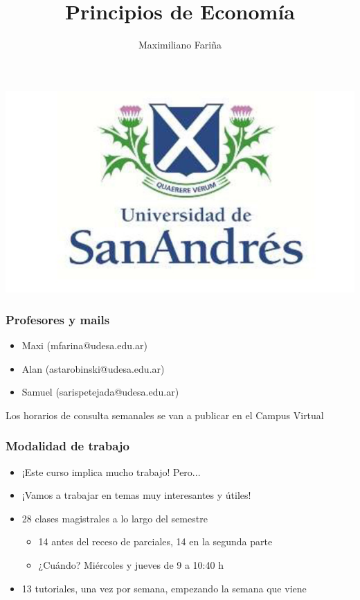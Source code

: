 \documentclass{beamer}
\title[Principios de Economía]{Principios de Economía}
\date{}
\author[Fariña]{Maximiliano Fariña }
\institute[]{Universidad de San Andrés \\
2023}
\begin{document}
\begin{frame}
\titlepage
\centering
\includegraphics[scale=0.25]{Slides Principios de Economia/Figures/logoUDESA.jpg} 
\end{frame}

\begin{frame}
\frametitle{Profesores y mails}
\begin{itemize}
    \item Maxi (mfarina@udesa.edu.ar)
    \item Alan (astarobinski@udesa.edu.ar)
    \item Samuel (sarispetejada@udesa.edu.ar)
\end{itemize}
Los horarios de consulta semanales se van a publicar en el Campus Virtual
\end{frame}

\begin{frame}
\frametitle{Modalidad de trabajo}
\begin{itemize}
    \item ¡Este curso implica mucho trabajo! Pero...  \vspace{2mm}
    \item ¡Vamos a trabajar en temas muy interesantes y útiles!  \vspace{2mm}
    \item 28 clases magistrales a lo largo del semestre 
\begin{itemize}
        \item 14 antes del receso de parciales, 14 en la segunda parte
        \item ¿Cuándo? Miércoles y jueves de 9 a 10:40 h
\end{itemize}
    \item 13 tutoriales, una vez por semana, empezando la semana que viene 
\end{itemize}
\end{frame}
\end{document}
